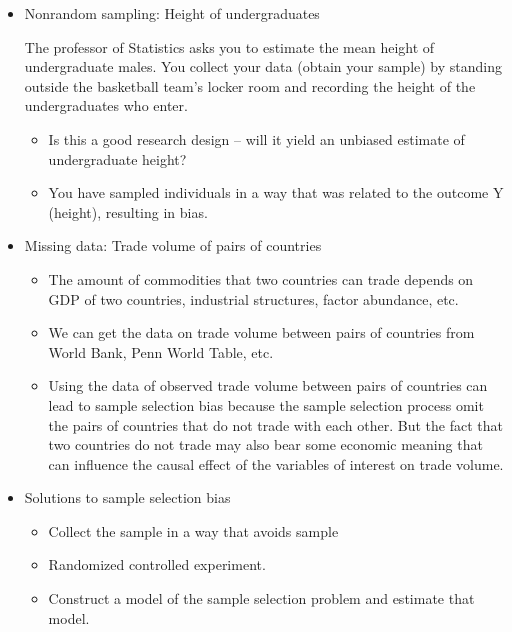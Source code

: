 \documentclass[a4paper,11pt]{article}
\begin{document}
\begin{itemize}
\item Nonrandom sampling: Height of undergraduates 

The professor of Statistics asks you to estimate the mean height of
undergraduate males. You collect your data (obtain your sample) by
standing outside the basketball team’s locker room and recording the
height of the undergraduates who enter.
\begin{itemize}
\item Is this a good research design – will it yield an unbiased
estimate of undergraduate height?
\item You have sampled individuals in a way that was related to
the outcome Y (height), resulting in bias.
\end{itemize}

\item Missing data: Trade volume of pairs of countries

\begin{itemize}
\item The amount of commodities that two countries can trade depends on
GDP of two countries, industrial structures, factor abundance,
etc.
\item We can get the data on trade volume between pairs of countries
from World Bank, Penn World Table, etc.
\item Using the data of observed trade volume between pairs of countries
can lead to sample selection bias because the sample selection
process omit the pairs of countries that do not trade with each
other. But the fact that two countries do not trade may also bear
some economic meaning that can influence the causal effect of the
variables of interest on trade volume.
\end{itemize}
\end{itemize}

\begin{itemize}
\item Solutions to sample selection bias
\label{sec:org8c20699}
\begin{itemize}
\item Collect the sample in a way that avoids sample
\item Randomized controlled experiment.
\item Construct a model of the sample selection problem and estimate that
model.
\end{itemize}
\end{itemize}
\end{document}
